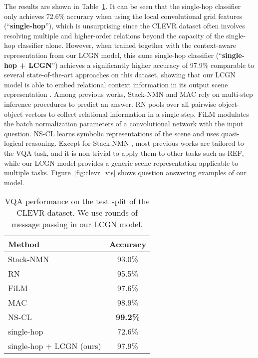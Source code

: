 \documentclass[10pt,twocolumn,letterpaper]{article}
\begin{document}
The results are shown in Table~\ref{tab:clevr}. It can be seen that the single-hop classifier only achieves 72.6\% accuracy when using the local convolutional grid features  (``\textbf{single-hop}''), which is unsurprising since the CLEVR dataset often involves resolving multiple and higher-order relations beyond the capacity of the single-hop classifier alone. However, when trained together with the context-aware representation  from our LCGN model, this same single-hop classifier (``\textbf{single-hop + LCGN}'') achieves a significantly higher accuracy of 97.9\% comparable to several state-of-the-art approaches on this dataset, showing that our LCGN model is able to embed relational context information in its output scene representation . Among previous works, Stack-NMN \cite{hu2018explainable} and MAC \cite{hudson2018compositional} rely on multi-step inference procedures to predict an answer. RN \cite{santoro2017simple} pools over all  pairwise object-object vectors to collect relational information in a single step. FiLM \cite{perez2018film} modulates the batch normalization parameters of a convolutional network with the input question. NS-CL \cite{mao2018neuro} learns symbolic representations of the scene and uses quasi-logical reasoning. Except for Stack-NMN \cite{hu2018explainable}, most previous works are tailored to the VQA task, and it is non-trivial to apply them to other tasks such as REF, while our LCGN model provides a generic scene representation applicable to multiple tasks. Figure~\ref{fig:clevr_vis} shows question answering examples of our model.

\begin{table}[t]
\small
\vspace{-1.5em}
\begin{center}
\begin{tabular}{lc}
\toprule
Method & Accuracy \\
\midrule
Stack-NMN \cite{hu2018explainable} & 93.0\% \\
RN \cite{santoro2017simple} & 95.5\% \\
FiLM \cite{perez2018film} & 97.6\% \\
MAC \cite{hudson2018compositional} & 98.9\% \\
NS-CL \cite{mao2018neuro} & \textbf{99.2\%} \\
\midrule
single-hop & 72.6\% \\
single-hop + LCGN (ours) & 97.9\% \\
\bottomrule
\end{tabular}
\end{center}
\vspace{-0.7em}
\caption{VQA performance on the test split of the CLEVR dataset. We use  rounds of message passing in our LCGN model.}
\label{tab:clevr}
\vspace{-1.5em}
\end{table}
\end{document}
